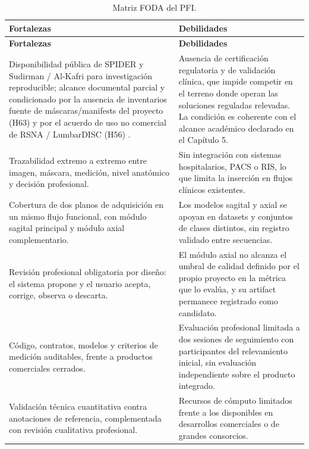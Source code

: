 \begingroup
\small
\sloppy
\setlength{\emergencystretch}{3em}
\setlength{\tabcolsep}{3pt}
\setlength{\LTleft}{0pt}
\setlength{\LTright}{0pt}
\renewcommand{\arraystretch}{1.15}
\begin{longtable}{|>{\raggedright\arraybackslash}p{}|>{\raggedright\arraybackslash}p{}|}
\caption{Matriz FODA del PFI.}
\label{tab:estado-arte-foda}\\
\hline
\textbf{Fortalezas} & \textbf{Debilidades} \\
\hline
\endfirsthead
\hline
\textbf{Fortalezas} & \textbf{Debilidades} \\
\hline
\endhead
Disponibilidad pública de SPIDER y Sudirman / Al-Kafri para investigación reproducible; alcance documental parcial y condicionado por la ausencia de inventarios fuente de máscaras/manifests del proyecto (H63) y por el acuerdo de uso no comercial de RSNA / LumbarDISC (H56) \parencite{vandergraaf_spider_2024,alkafri_mendeley_dataset_2019,richards_lumbardisc_2026}. & Ausencia de certificación regulatoria y de validación clínica, que impide competir en el terreno donde operan las soluciones reguladas relevadas. La condición es coherente con el alcance académico declarado en el Capítulo 5. \\
\hline
Trazabilidad extremo a extremo entre imagen, máscara, medición, nivel anatómico y decisión profesional. & Sin integración con sistemas hospitalarios, PACS o RIS, lo que limita la inserción en flujos clínicos existentes. \\
\hline
Cobertura de dos planos de adquisición en un mismo flujo funcional, con módulo sagital principal y módulo axial complementario. & Los modelos sagital y axial se apoyan en datasets y conjuntos de clases distintos, sin registro validado entre secuencias. \\
\hline
Revisión profesional obligatoria por diseño: el sistema propone y el usuario acepta, corrige, observa o descarta. & El módulo axial no alcanza el umbral de calidad definido por el propio proyecto en la métrica que lo evalúa, y su artifact permanece registrado como candidato. \\
\hline
Código, contratos, modelos y criterios de medición auditables, frente a productos comerciales cerrados. & Evaluación profesional limitada a dos sesiones de seguimiento con participantes del relevamiento inicial, sin evaluación independiente sobre el producto integrado. \\
\hline
Validación técnica cuantitativa contra anotaciones de referencia, complementada con revisión cualitativa profesional. & Recursos de cómputo limitados frente a los disponibles en desarrollos comerciales o de grandes consorcios. \\

\end{longtable}

